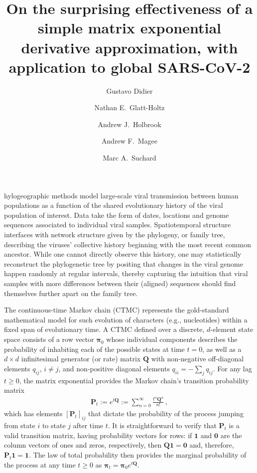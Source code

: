 \documentclass[9pt,twocolumn,twoside]{pnas-new}
\title{On the surprising effectiveness of a simple matrix exponential derivative approximation, with application to global SARS-CoV-2}
\author[a]{Gustavo Didier}
\author[a]{Nathan E.~Glatt-Holtz}
\author[b,1]{Andrew J.~Holbrook}
\author[b]{Andrew F.~Magee}
\author[b,c,d]{Marc A.~Suchard}
\affil[a]{Department of Mathematics, Tulane University}
\affil[b]{Department of Biostatistics, University of California, Los Angeles}
\affil[c]{Department of Biomathematics, University of California, Los Angeles}
\affil[d]{Department of Human Genetics, University of California, Los Angeles}
\newcommand{\?}{\textbf{?}}
\newcommand{\QQ}{\mathbf{Q}}
\newcommand{\Zero}{\boldsymbol{0}}
\newcommand{\ppi}{\boldsymbol{\pi}}
\renewcommand{\P}{\mathbf{P}}
\newcommand{\one}{\mathbf{1}}
\begin{document}
\maketitle
\thispagestyle{firststyle}




hylogeographic methods
\cite{lemey2009bayesian, lemey2014unifying, holbrook2021massive,
  holbrook2022viral} model large-scale viral transmission between
human populations as a function of the shared evolutionary history of
the viral population of interest.  Data take the form of dates,
locations and genome sequences associated to individual viral
samples. Spatiotemporal structure interfaces with network structure
given by the phylogeny, or family tree, describing the viruses'
collective history beginning with the most recent common ancestor.
While one cannot directly observe this history, one may statistically
reconstruct the phylogenetic tree by positing that changes in the
viral genome happen randomly at regular intervals, thereby capturing
the intuition that viral samples with more differences between their
(aligned) sequences should find themselves further apart on the family
tree.

The continuous-time Markov chain (CTMC) \cite{norris_1997}
represents the gold-standard mathematical model for such evolution of
characters (e.g., nucleotides) within a fixed span of evolutionary
time. A CTMC defined over a discrete, $d$-element state space consists
of a row vector $\ppi_0$ whose individual components describes the
probability of inhabiting each of the possible states at time $t=0$,
as well as a $d\times d$ infinitesimal generator (or rate) matrix
$\QQ$ with non-negative off-diagonal elements $q_{ij}$, $i\neq j$, and
non-positive diagonal elements $q_{ii}=-\sum_j q_{ij}$. For any lag
$t\geq 0$, the matrix exponential
\cite{moler1978nineteen,moler2003nineteen} provides the Markov chain's
transition probability matrix
\begin{align}
    \P_t := e^{t \QQ} := \sum_{n=0}^\infty \frac{t^n\QQ^n}{n!}  \, ,
\end{align}
which has elements $[\P_t]_{ij}$ that dictate the probability of the
process jumping from state $i$ to state $j$ after time $t$. It is
straightforward to verify that $\P_t$ is a valid transition matrix,
having probability vectors for rows: if $\one$ and $\Zero$ are the
column vectors of ones and zeros, respectively, then $\QQ\one=\Zero$
and, therefore, $\P_t\one=\one$. The law of total probability then
provides the marginal probability of the process at any time
$t \geq 0$ as $\ppi_t=\ppi_0 e^{t\QQ}$.
\end{document}
